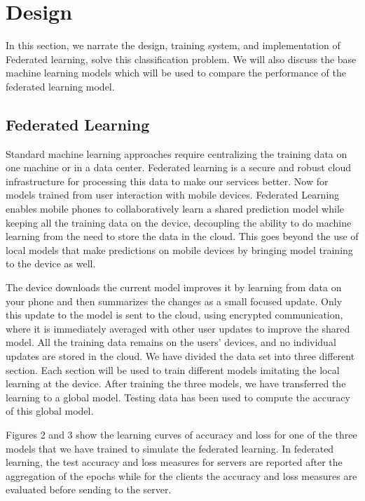 \documentclass[12pt,conference]{IEEEtran}
\begin{document}
\section{
\textbf{Design}\label{sec:e}
}

In this section, we narrate the design, training system, and implementation of Federated learning, solve this classification problem. We will also discuss the base machine learning models which will be used to compare the performance of the federated learning model.

\subsection{Federated Learning}

Standard machine learning approaches require centralizing the training data on one machine or in a data center. Federated learning is a secure and robust cloud infrastructure for processing this data to make our services better. Now for models trained from user interaction with mobile devices.
Federated Learning enables mobile phones to collaboratively learn a shared prediction model while keeping all the training data on the device, decoupling the ability to do machine learning from the need to store the data in the cloud. This goes beyond the use of local models that make predictions on mobile devices by bringing model training to the device as well.

The device downloads the current model improves it by learning from data on your phone and then summarizes the changes as a small focused update. Only this update to the model is sent to the cloud, using encrypted communication, where it is immediately averaged with other user updates to improve the shared model. All the training data remains on the users' devices, and no individual updates are stored in the cloud.
We have divided the data set into three different section. Each section will be used to train different models imitating the local learning at the device. After training the three models, we have transferred the learning to a global model. Testing data has been used to compute the accuracy of this global model.

Figures 2 and 3 show the learning curves of accuracy and loss for one of the three models that we have trained to simulate the federated learning. 
In federated learning, the test accuracy and loss measures for servers are reported after the aggregation of the epochs while for the clients the accuracy and loss measures are evaluated before sending to the server.
\end{document}
